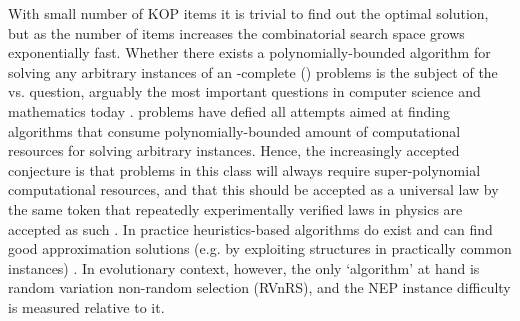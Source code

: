     With small number of KOP items it is trivial to find out the optimal solution, but as the number of items increases the combinatorial search space grows exponentially fast. Whether there exists a polynomially-bounded algorithm for solving any arbitrary instances of an -complete () problems is the subject of the  vs.  question, arguably the most important questions in computer science and mathematics today \cite{aaronson_limits_2004, aaronson_guest_2005, fortnow_status_2009}.  problems have defied all attempts aimed at finding algorithms that consume polynomially-bounded amount of computational resources for solving arbitrary instances. Hence, the increasingly accepted conjecture is that problems in this class will always require super-polynomial computational resources, and that this should be accepted as a universal law by the same token that repeatedly experimentally verified laws in physics are accepted as such \cite{wigderson_opening_2014}.
    In practice heuristics-based algorithms do exist and can find good approximation solutions (e.g. by exploiting structures in practically common instances) \cite{vazirani_approximation_2013,lawler_fast_1979}. In evolutionary context, however, the only `algorithm' at hand is random variation non-random selection (RVnRS), and the NEP instance difficulty is measured relative to it.
